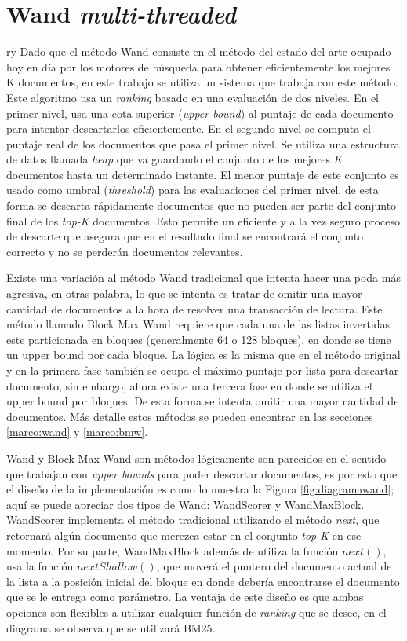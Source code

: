 \chapter{Wand \textit{multi-threaded}}
\label{cap:wand}ry
Dado que el método Wand \citep{Broder:2003} consiste en el método del estado del arte ocupado hoy en día por los motores de búsqueda para obtener eficientemente los mejores K documentos, en este trabajo se utiliza un sistema que trabaja con este método. Este algoritmo usa un \textit{ranking} basado en una evaluación de dos niveles. En el primer nivel, usa una cota superior (\textit{upper bound}) al puntaje de cada documento para intentar descartarlos eficientemente. En el segundo nivel se computa el puntaje real de los documentos que pasa el primer nivel. Se utiliza una estructura de datos llamada \textit{heap} que va guardando el conjunto de los mejores $K$ documentos hasta un determinado instante. El menor puntaje de este conjunto es usado como umbral (\textit{threshold}) para las evaluaciones del primer nivel, de esta forma se descarta rápidamente documentos que no pueden ser parte del conjunto final de los \textit{top-K} documentos. Esto permite un eficiente y a la vez seguro proceso de descarte que asegura que en el resultado final se encontrará el conjunto correcto y no se perderán documentos relevantes.

Existe una variación al método Wand tradicional que intenta hacer una poda más agresiva, en otras palabra, lo que se intenta es tratar de omitir una mayor cantidad de documentos a la hora de resolver una transacción de lectura. Este método llamado Block Max Wand requiere que cada una de las listas invertidas este particionada en bloques (generalmente 64 o 128 bloques), en donde se tiene un upper bound por cada bloque. La lógica es la misma que en el método original y en la primera fase también se ocupa el máximo puntaje por lista para descartar documento, sin embargo, ahora existe una tercera fase en donde se utiliza el upper bound por bloques. De esta forma se intenta omitir una mayor cantidad de documentos. Más detalle estos métodos se pueden encontrar en las secciones \ref{marco:wand} y \ref{marco:bmw}.

Wand y Block Max Wand son métodos lógicamente son parecidos en el sentido que trabajan con \textit{upper bounds} para poder descartar documentos, es por esto que el diseño de la implementación es como lo muestra la Figura \ref{fig:diagramawand}; aquí se puede apreciar dos tipos de Wand: WandScorer y WandMaxBlock. WandScorer implementa el método tradicional utilizando el método \textit{next}, que retornará algún documento que merezca estar en el conjunto \textit{top-K} en ese momento. Por su parte, WandMaxBlock además de utiliza la función \textit{$next()$}, usa la función \textit{$nextShallow()$}, que moverá el puntero del documento actual de la lista a la posición inicial del bloque en donde debería encontrarse el documento que se le entrega como parámetro. 
La ventaja de este diseño es que ambas opciones son flexibles a utilizar cualquier función de \textit{ranking} que se desee, en el diagrama se observa que se utilizará BM25.

